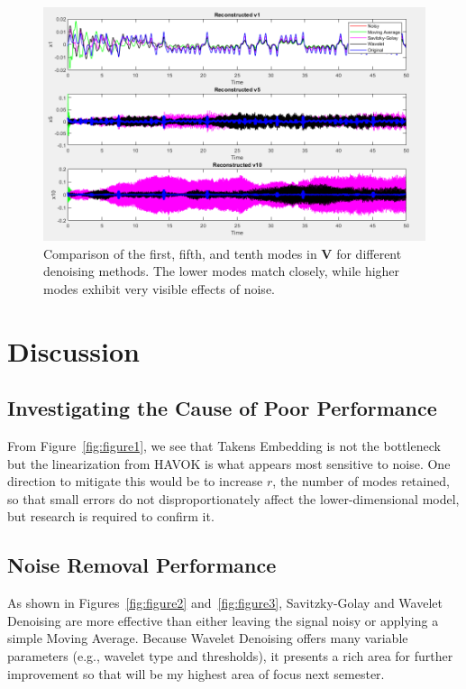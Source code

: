 \documentclass[11pt]{article}
\begin{document}
	\begin{figure}[htbp]
		\centering
		\includegraphics[width=0.7\linewidth]{Figure6}
		\caption{Comparison of the first, fifth, and tenth modes in \(\mathbf{V}\) for different denoising methods. The lower modes match closely, while higher modes exhibit very visible effects of noise.}
		\label{fig:figure6}
	\end{figure}
	
	\section{Discussion}
	
	\subsection{Investigating the Cause of Poor Performance}
	From Figure~\ref{fig:figure1}, we see that Takens Embedding is not the bottleneck but the linearization from HAVOK is what appears most sensitive to noise. One direction to mitigate this would be to increase \(r\), the number of modes retained, so that small errors do not disproportionately affect the lower-dimensional model, but research is required to confirm it.
	
	\subsection{Noise Removal Performance}
	As shown in Figures~\ref{fig:figure2} and~\ref{fig:figure3}, Savitzky-Golay and Wavelet Denoising are more effective than either leaving the signal noisy or applying a simple Moving Average. Because Wavelet Denoising offers many variable parameters (e.g., wavelet type and thresholds), it presents a rich area for further improvement so that will be my highest area of focus next semester.
	
\end{document}
